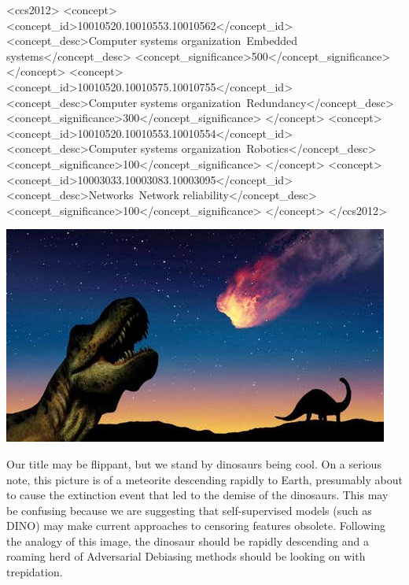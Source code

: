 \documentclass[sigconf,anonymous,review]{acmart}
\begin{document}
\begin{CCSXML}
<ccs2012>
 <concept>
  <concept_id>10010520.10010553.10010562</concept_id>
  <concept_desc>Computer systems organization~Embedded systems</concept_desc>
  <concept_significance>500</concept_significance>
 </concept>
 <concept>
  <concept_id>10010520.10010575.10010755</concept_id>
  <concept_desc>Computer systems organization~Redundancy</concept_desc>
  <concept_significance>300</concept_significance>
 </concept>
 <concept>
  <concept_id>10010520.10010553.10010554</concept_id>
  <concept_desc>Computer systems organization~Robotics</concept_desc>
  <concept_significance>100</concept_significance>
 </concept>
 <concept>
  <concept_id>10003033.10003083.10003095</concept_id>
  <concept_desc>Networks~Network reliability</concept_desc>
  <concept_significance>100</concept_significance>
 </concept>
</ccs2012>
\end{CCSXML}




\begin{teaserfigure}
    \includegraphics[width=\textwidth]{paper/assets/in-dinosaur killing comet.jpeg}
    \caption{Our title may be flippant, but we stand by dinosaurs being cool. On a serious note, this picture is of a meteorite descending rapidly to Earth, presumably about to cause the extinction event that led to the demise of the dinosaurs. This may be confusing because we are suggesting that self-supervised models (such as DINO) may make current approaches to censoring features obsolete. Following the analogy of this image, the dinosaur should be rapidly descending and a roaming herd of Adversarial Debiasing methods should be looking on with trepidation.}
    \label{fig:my_label}
\end{teaserfigure}
\end{document}

